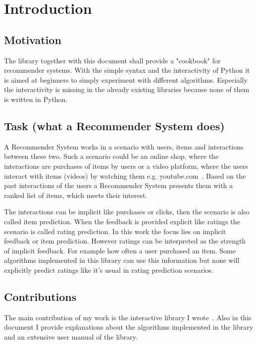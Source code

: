 \chapter{Introduction}


\section{Motivation}

The library together with this document shall provide a "cookbook"
for recommender systems. With the simple syntax and the interactivity
of Python it is aimed at beginners to simply experiment with different
algorithms. Especially the interactivity is missing in the already
existing libraries because none of them is written in Python.


\section{Task (what a Recommender System does)}

A Recommender System works in a scenario with users, items and interactions
between these two. Such a scenario could be an online shop,
where the interactions are purchases of items by users or a video
platform, where the users interact with items (videos) by watching
them e.g. youtube.com~\cite{youtube}. Based on the past interactions of the users
a Recommender System presents them with a ranked list of items, which meets their interest.

The interactions can be implicit like purchases or clicks, then the
scenario is also called item prediction. When the feedback is provided
explicit like ratings the scenario is called rating prediction. In
this work the focus lies on implicit feedback or item prediction.
However ratings can be interpreted as the strength of implicit feedback.
For example how often a user purchased an item. Some algorithms implemented
in this library can use this information but none will explicitly
predict ratings like it's usual in rating prediction scenarios.


\section{Contributions}

The main contribution of my work is the interactive library I wrote~\cite{recsyslab}. 
Also in this document I provide explanations about
the algorithms implemented in the library and an extensive user manual
of the library.

